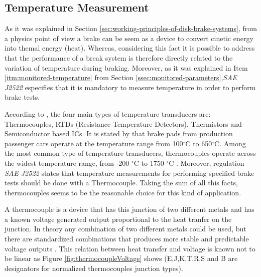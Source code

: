 \subsection{Temperature Measurement} \label{ssec:temperatureMeasurement}
	As it was explained in Section \ref{sec:working-principles-of-disk-brake-systems}, from a physics point of view a brake can be seem as a device to convert cinetic energy into themal energy (heat). Whereas, considering this fact it is possible to address that the performance of a break system is therefore directly related to the variation of temperature during braking. Moreover, as it was explained in Item \ref{itm:monitored-temperature} from Section \ref{ssec:monitored-parameters},\textit{SAE J2522} \cite{saej2522} especifies that it is mandatory to measure temperature in order to perform brake tests.
	\par
	According to \cite{gums2018}, the four main types of temperature transducers are: Thermocouples, RTDs (Resistance Temperature Detectors), Thermistors and Semiconductor based ICs. It is stated by \cite{newton2016braketemperatures} that brake pads from production passenger cars operate at the temperature range from 100$^{\circ}$C to 650$^{\circ}$C. Among the most common type of temperature transducers, thermocouples operate across the widest temperature range, from -200 $^{\circ}$C to 1750 $^{\circ}$C \cite{ametherm2018}. Moreover, regulation \textit{SAE J2522} \cite{saej2522} states that temperature measurements for performing specified brake tests should be done with a Thermocouple. Taking the sum of all this facts, thermocouples seems to be the reasonable choice for this kind of application.
	\par
	A thermocouple is a device that has this junction of two different metals and has a known voltage generated output proportional to the heat tranfer on the junction. In theory any combination of two different metals could be used, but there are standardized combinations that produces more stable and predictable voltage outputs \cite{pollock1991thermocouples}. This relation between heat transfer and voltage is known not to be linear as Figure \ref{fig:thermocoupleVoltage} shows (E,J,K,T,R,S and B are designators for normalized thermocouples junction types).


